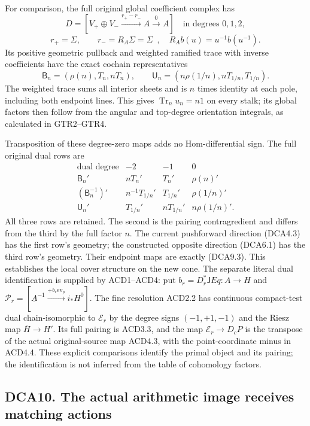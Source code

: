 For comparison, the full original global coefficient complex has \[
D=[V_+\oplus V_-\xrightarrow{r_+-r_-}A\xrightarrow0A]
\quad\text{in degrees }0,1,2,
\] \[
r_+=\Sigma,\qquad r_-=R_A\Sigma=\Sigma\widehat{\phantom f},
\quad R_Ab(u)=u^{-1}b(u^{-1}).
\tag{DCA9.5}
\] Its positive geometric pullback and weighted ramified trace with
inverse coefficients have the exact cochain representatives \[
\mathsf B_n=(\rho(n),T_n,nT_n),\qquad
\mathsf U_n=(n\rho(1/n),nT_{1/n},T_{1/n}).
\tag{DCA9.6}
\] The weighted trace sums all interior sheets and is \(n\) times
identity at each pole, including both endpoint lines. This gives
\(\operatorname{Tr}_n u_n=n1\) on every stalk; its global factors then
follow from the angular and top-degree orientation integrals, as
calculated in GTR2--GTR4.

Transposition of these degree-zero maps adds no Hom-differential sign.
The full original dual rows are \[
\begin{array}{c|ccc}
\text{dual degree}&-2&-1&0\\\hline
\mathsf B_n'&nT_n'&T_n'&\rho(n)'\\
(\mathsf B_n^{-1})'&n^{-1}T_{1/n}'&T_{1/n}'&\rho(1/n)'\\
\mathsf U_n'&T_{1/n}'&nT_{1/n}'&n\rho(1/n)'.
\end{array}
\tag{DCA9.7}
\] All three rows are retained. The second is the pairing contragredient
and differs from the third by the full factor \(n\). The current
pushforward direction (DCA4.3) has the first row's geometry; the
constructed opposite direction (DCA6.1) has the third row's geometry.
Their endpoint maps are exactly (DCA9.3). This establishes the local
cover structure on the new cone. The separate literal dual
identification is supplied by ACD1--ACD4: put
\(b_r=D_r^*\mathsf JEq:A\to H\) and
\(\mathscr P_r=[\underline A^{-1}\xrightarrow{+b_r\mathrm{ev}_p}i_*H^0]\).
The fine resolution ACD2.2 has continuous compact-test dual
chain-isomorphic to \(\mathscr E_r\) by the degree signs \((-1,+1,-1)\)
and the Riesz map \(\overline H\to H'\). Its full pairing is ACD3.3, and
the map \(\mathscr E_r\to D_cP\) is the transpose of the actual
original-source map ACD4.3, with the point-coordinate minus in ACD4.4.
These explicit comparisons identify the primal object and its pairing;
the identification is not inferred from the table of cohomology factors.

\subsection{DCA10. The actual arithmetic image receives matching
actions}\label{dca10.-the-actual-arithmetic-image-receives-matching-actions}


